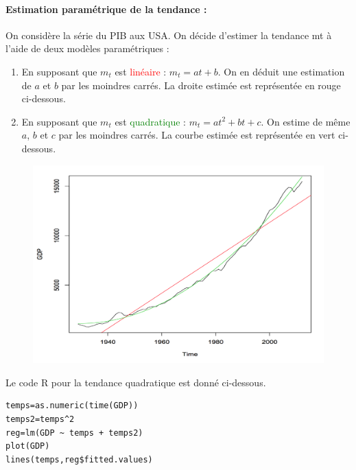 \paragraph{Estimation paramétrique de la tendance : } On considère la série du PIB aux USA.\newline
On décide d'estimer la tendance mt à l'aide de deux modèles paramétriques :
\begin{enumerate}
\item En supposant que $m_{t}$ est \textcolor{red}{linéaire} : $m_{t} = at + b$.\newline
On en déduit une estimation de $a$ et $b$ par les moindres carrés. La droite estimée est représentée en rouge ci-dessous.
\item En supposant que $m_{t}$ est \textcolor{green}{quadratique} : $m_{t} = at^{2} + bt + c$.
On estime de même $a$, $b$ et $c$ par les moindres carrés. La courbe estimée est représentée en vert ci-dessous.
\end{enumerate}
\begin{figure}[H]\begin{center}\includegraphics[scale=0.5]{ilu/ccm34.png}\end{center}\end{figure}
Le code R pour la tendance quadratique est donné ci-dessous.
\begin{lstlisting}[language=html]
temps=as.numeric(time(GDP))
temps2=temps^2
reg=lm(GDP ~ temps + temps2)
plot(GDP)
lines(temps,reg$fitted.values)
\end{lstlisting}


